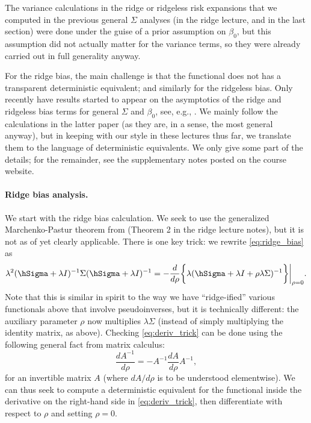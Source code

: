 \documentclass{article}
\begin{document}
The variance calculations in the ridge or ridgeless risk expansions that we
computed in the previous general $\Sigma$ analyses (in the ridge lecture, and in
the last section) were done under the guise of a prior assumption on $\beta_0$,
but this assumption did not actually matter for the variance terms, so they were
already carried out in full generality anyway.     

For the ridge bias, the main challenge is that the functional  does not has a transparent
deterministic equivalent; and similarly for the ridgeless bias. Only recently
have results started to appear on the asymptotics of the ridge and ridgeless
bias terms for general $\Sigma$ and $\beta_0$, see, e.g., \citet{wu2020optimal, 
  richards2021asymptotics, hastie2022surprises}. We mainly follow the
calculations in the latter paper (as they are, in a sense, the most general
anyway), but in keeping with our style in these lectures thus far, we translate
them to the language of deterministic equivalents. We only give some part of the
details; for the remainder, see the supplementary notes posted on the course
website.   

\paragraph{Ridge bias analysis.}

We start with the ridge bias calculation. We seek to use the generalized
Marchenko-Pastur theorem from \citet{rubio2011spectral} (Theorem 2 in the ridge
lecture notes), but it is not as of yet clearly applicable. There is one key
trick: we rewrite \eqref{eq:ridge_bias} as
\begin{equation}
\label{eq:deriv_trick}
\lambda^2 (\hSigma + \lambda I)^{-1} \Sigma (\hSigma + \lambda I)^{-1} = 
-\frac{d}{d\rho} \bigg\{ \lambda (\hSigma + \lambda I + \rho \lambda 
\Sigma)^{-1} \bigg\} \bigg|_{\rho=0}.  
\end{equation}
Note that this is similar in spirit to the way we have ``ridge-ified'' various
functionals above that involve pseudoinverses, but it is technically different:
the auxiliary parameter $\rho$ now multiplies $\lambda \Sigma$ (instead of simply
multiplying the identity matrix, as above). Checking \eqref{eq:deriv_trick} can
be done using the following general fact from matrix calculus: 
\begin{equation}
\label{eq:matrix_inv_deriv}
\frac{dA^{-1}}{d\rho} = - A^{-1} \frac{dA}{d\rho} A^{-1},
\end{equation}
for an invertible matrix $A$ (where $dA/d\rho$ is to be understood
elementwise). We can thus seek to compute a deterministic equivalent for the
functional inside the derivative on the right-hand side in
\eqref{eq:deriv_trick}, then differentiate with respect to $\rho$ and setting 
$\rho=0$. 
\end{document}
